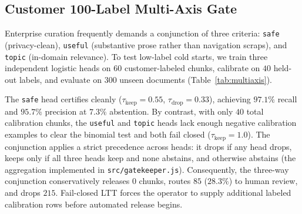 \documentclass{article}
\begin{document}
\subsection{Customer 100-Label Multi-Axis Gate}
Enterprise curation frequently demands a conjunction of three criteria: \texttt{safe} (privacy-clean), \texttt{useful} (substantive prose rather than navigation scraps), and \texttt{topic} (in-domain relevance). To test low-label cold starts, we train three independent logistic heads on $60$ customer-labeled chunks, calibrate on $40$ held-out labels, and evaluate on $300$ unseen documents (Table~\ref{tab:multiaxis}).

\begin{table}[t]
\caption{Customer 100-label multi-axis gate ($60$ train, $40$ calibration, $300$ held-out). Uncertifiable heads fail closed at $\tau_{\text{keep}}=1.0$.}
\label{tab:multiaxis}
\vskip 0.08in
\begin{center}
\end{center}
\vskip -0.14in
\end{table}

The \texttt{safe} head certifies cleanly ($\tau_{\text{keep}}=0.55$, $\tau_{\text{drop}}=0.33$), achieving $97.1\%$ recall and $95.7\%$ precision at $7.3\%$ abstention. By contrast, with only $40$ total calibration chunks, the \texttt{useful} and \texttt{topic} heads lack enough negative calibration examples to clear the binomial test and both fail closed ($\tau_{\text{keep}}=1.0$). The conjunction applies a strict precedence across heads: it drops if any head drops, keeps only if all three heads keep and none abstains, and otherwise abstains (the aggregation implemented in \texttt{src/gatekeeper.js}). Consequently, the three-way conjunction conservatively releases $0$ chunks, routes $85$ ($28.3\%$) to human review, and drops $215$. Fail-closed LTT forces the operator to supply additional labeled calibration rows before automated release begins.
\end{document}

